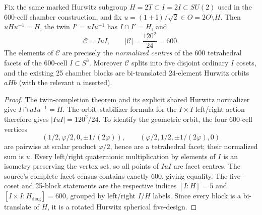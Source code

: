 \documentclass[11pt]{article}
\begin{document}
\begin{theorem}
\label{p1b:thm:cc17-facet-double-coset}
Fix the same marked Hurwitz subgroup $H=2T\subset I=2I\subset SU(2)$
used in the 600-cell chamber construction, and fix
$u=(1+\mathbf i)/\sqrt2\in O=2O\setminus H$.
Then $uHu^{-1}=H$, the twin $I'=uIu^{-1}$ has
$I\cap I'=H$, and
\[
\boxed{\mathscr C=IuI,\qquad|\mathscr C|=\frac{120^2}{24}=600.}
\]
The elements of $\mathscr C$ are precisely the \emph{normalized centres}
of the $600$ tetrahedral facets of the 600-cell $I\subset S^3$.
Moreover $\mathscr C$ splits into five disjoint ordinary $I$ cosets,
and the existing 25 chamber blocks are bi-translated $24$-element
Hurwitz orbits $aHb$ (with the relevant $u$ inserted).
\end{theorem}
\begin{proof}
The twin-completion theorem and its explicit shared Hurwitz normalizer
give $I\cap uIu^{-1}=H$. The orbit--stabilizer formula for the
$I\times I$ left/right action therefore gives $|IuI|=120^2/24$.
To identify the geometric orbit, the four 600-cell vertices
\[
 (1/2,\varphi/2,0,\pm 1/(2\varphi)),\qquad
 (\varphi/2,1/2,\pm1/(2\varphi),0)
\]
are pairwise at scalar product $\varphi/2$, hence are a tetrahedral
facet; their normalized sum is $u$. Every left/right quaternionic
multiplication by elements of $I$ is an isometry preserving the
vertex set, so all points of $IuI$ are facet centres. The source's
complete facet census contains exactly 600, giving equality.
The five-coset and 25-block statements are the respective indices
$[I:H]=5$ and $[I\times I:H_{\mathrm{diag}}]=600$, grouped by
left/right $I/H$ labels. Since every block is a bi-translate of $H$,
it is a rotated Hurwitz spherical five-design.
\end{proof}
\end{document}
